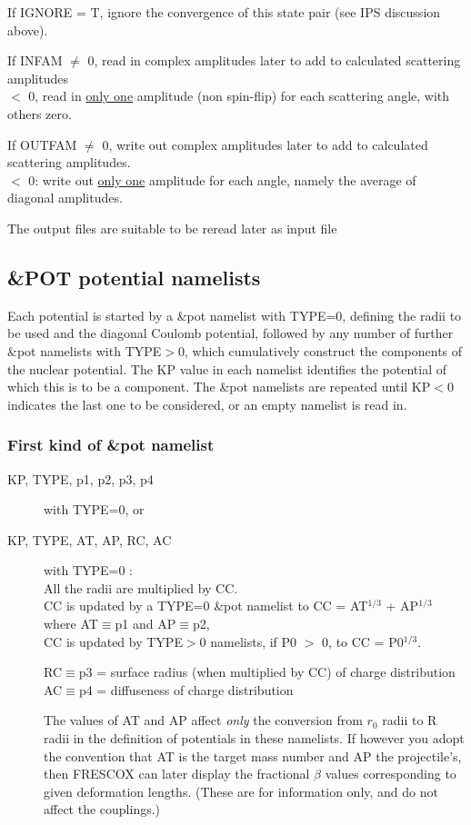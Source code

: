 \documentclass[11pt]{article}
\begin{document}
\begin{description}
If IGNORE = T, ignore the convergence of this  state pair
(see IPS discussion above).

If INFAM $\ne$ 0,  read in complex amplitudes later to add to
calculated scattering amplitudes\\
$<$ 0, read in \underline{only one} amplitude (non spin-flip)
for each scattering angle, with others zero.

If OUTFAM $\ne$ 0,  write out complex amplitudes later to add to
calculated scattering amplitudes.\\
$<$ 0: write out \underline{only one} amplitude 
for each  angle, namely the average of diagonal amplitudes.


The output files are suitable to be reread later as input file
\end{description}

\newpage
\subsection{\&POT potential namelists}
\label{potentials}
%
Each potential is started by a \&pot namelist with TYPE=0, defining the radii to be used
and the diagonal Coulomb potential, followed by any number of further \&pot namelists with TYPE$>$0,
which cumulatively construct the components of the nuclear potential.
The KP value in each namelist identifies the potential of which this is to be a component.
The \&pot namelists are repeated until KP$<0$ indicates the last one to be considered, or an empty namelist is read in.


\subsubsection{First kind of \&pot namelist}

\begin{description}
\item[KP, TYPE,  p1, p2, p3, p4]  with TYPE=0, or 
\item[KP, TYPE,  AT, AP,  RC, AC] with TYPE=0 : \\
%
    All the radii are multiplied by CC. \\
       CC is updated by a TYPE=0 \&pot namelist to CC = AT$^{1/3}$ + AP$^{1/3}$ where AT$\equiv$p1 and AP$\equiv$p2, \\
       CC is updated by TYPE$>$0 namelists, if P0 $>$ 0,  to CC = P0$^{1/3}$.

RC$\equiv$p3 = surface radius (when multiplied by CC) of charge distribution\\
AC$\equiv$p4  = diffuseness of charge distribution



The values of AT and AP affect {\em only} the conversion from $r_0$ radii
to R radii in the definition of potentials in these namelists.
If however you adopt the convention that AT is the target mass number
and AP the projectile's, then FRESCOX can later display the
fractional $\beta$ values corresponding to given deformation lengths.
(These are for information only, and do not affect the couplings.)


\end{description}
\end{document}
